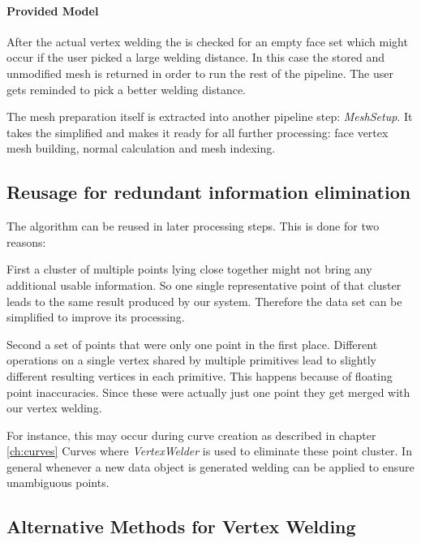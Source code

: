 \documentclass[../ClassicThesis.tex]{subfiles}
\begin{document}
\paragraph{Provided Model}

After the actual vertex welding the {\threedmodel} is checked for an empty face set which might occur if the user picked a large welding distance. In this case the stored and unmodified mesh is returned in order to run the rest of the pipeline. The user gets reminded to pick a better welding distance.

The mesh preparation itself is extracted into another pipeline step: \emph{MeshSetup}. It takes the simplified {\threedmodel} and makes it ready for all further processing: face vertex mesh building, normal calculation and mesh indexing.


    
\subsection{Reusage for redundant information elimination}

The algorithm can be reused in later processing steps. This is done for two reasons: 

First a cluster of multiple points lying close together might not bring any additional usable information. So one single representative point of that cluster leads to the same result produced by our system. Therefore the data set can be simplified to improve its processing.

Second a set of points that were only one point in the first place. Different operations on a single vertex shared by multiple primitives lead to slightly different resulting vertices in each primitive. This happens because of floating point inaccuracies. Since these were actually just one point they get merged with our vertex welding.

For instance, this may occur during curve creation as described in chapter \ref{ch:curves} Curves where \emph{VertexWelder} is used to eliminate these point cluster. In general whenever a new data object is generated welding can be applied to ensure unambiguous points.





\subsection{Alternative Methods for Vertex Welding}
\end{document}
